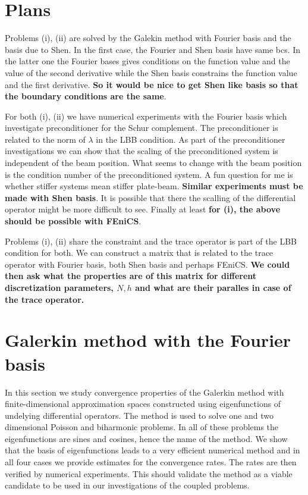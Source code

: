 \documentclass[a4paper,10pt]{article}
\begin{document}
  \section{Plans}

  Problems (i), (ii) are solved by the Galekin method with Fourier basis and
  the basis due to Shen. In the first case, the Fourier and Shen basis have
  same bcs. In the latter one the Fourier bases gives conditions on the function
  value and the value of the second derivative while the Shen basis constrains
  the function value and the first derivative. \textbf{So it would be nice to 
  get Shen like basis so that the boundary conditions are the same}.

  For both (i), (ii) we have numerical experiments with the Fourier basis which
  investigate preconditioner for the Schur complement. The preconditioner is
  related to the norm of $\lambda$ in the LBB condition. As part of the
  preconditioner investigations we can show that the scaling of the preconditioned
  system is independent of the beam position. What seems to change
  with the beam position is the condition number of the preconditioned system.
  A fun question for me is whether stiffer systems mean stiffer plate-beam. 
  \textbf{Similar experiments must be made with Shen basis}. It is possible that
  there the scalling of the differential operator might be more difficult to see.
  Finally at least \textbf{for (i), the above should be possible with FEniCS}.

  Problems (i), (ii) share the constraint and the trace operator is part of the
  LBB condition for both. We can construct a matrix that is related to the trace
  operator with Fourier basis, both Shen basis and perhaps FEniCS. \textbf{We
  could then ask what the properties are of this matrix for different discretization
  parameters, $N, h$ and what are their paralles in case of the trace operator.}


  \section{Galerkin method with the Fourier basis}
  In this section we study convergence properties of the Galerkin method with 
  finite-dimensional approximation spaces constructed using eigenfunctions of
  undelying differential operators. The method is used to solve one and two
  dimensional Poisson and biharmonic problems. In all of these problems the 
  eigenfunctions are sines and cosines, hence the name of the method. We show 
  that the basis of eigenfunctions leads to a very efficient numerical method
  and in all four cases we provide estimates for the convergence rates.
  The rates are then verified by numerical experiments. This should validate
  the method as a viable candidate to be used in our investigations of the
  coupled problems.
\end{document}
